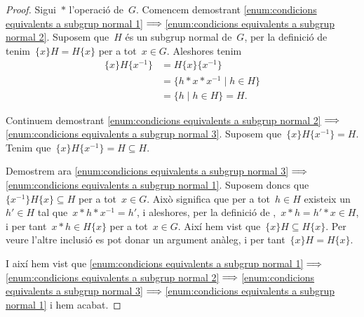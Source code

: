 \documentclass[../../main.tex]{subfiles}
\begin{document}
    \begin{proof}
        Sigui~\(\ast\) l'operació de~\(G\).
        Comencem demostrant \eqref{enum:condicions equivalents a subgrup normal 1}\(\implies\)\eqref{enum:condicions equivalents a subgrup normal 2}.
        Suposem que~\(H\) és un subgrup normal de~\(G\), per la definició de  tenim~\(\{x\}H=H\{x\}\) per a tot~\(x\in G\).
        Aleshores tenim
        \begin{align*}
        \{x\}H\{x^{-1}\}&=H\{x\}\{x^{-1}\}\\
        &=\{h\ast x\ast x^{-1}\mid h\in H\}\\
        &=\{h\mid h\in H\}=H.
        \end{align*}

        Continuem demostrant \eqref{enum:condicions equivalents a subgrup normal 2}\(\implies\)\eqref{enum:condicions equivalents a subgrup normal 3}.
        Suposem que~\(\{x\}H\{x^{-1}\}=H\).
        Tenim que~\(\{x\}H\{x^{-1}\}=H\subseteq H\).

        Demostrem ara \eqref{enum:condicions equivalents a subgrup normal 3}\(\implies\)\eqref{enum:condicions equivalents a subgrup normal 1}.
        Suposem doncs que~\(\{x^{-1}\}H\{x\}\subseteq H\) per a tot~\(x\in G\).
        Això significa que per a tot~\(h\in H\) existeix un~\(h'\in H\) tal que~\(x\ast h\ast x^{-1}=h'\), i aleshores, per la definició de ,~\(x\ast h=h'\ast x\in H\), i per tant~\(x\ast h\in H\{x\}\) per a tot~\(x\in G\).
        Així hem vist que~\(\{x\}H\subseteq H\{x\}\).
        Per veure l'altre inclusió es pot donar un argument anàleg, i per tant~\(\{x\}H= H\{x\}\).

        I així hem vist que \eqref{enum:condicions equivalents a subgrup normal 1}\(\implies\)\eqref{enum:condicions equivalents a subgrup normal 2}\(\implies\)\eqref{enum:condicions equivalents a subgrup normal 3}\(\implies\)\eqref{enum:condicions equivalents a subgrup normal 1} i hem acabat.
    \end{proof}
\end{document}
